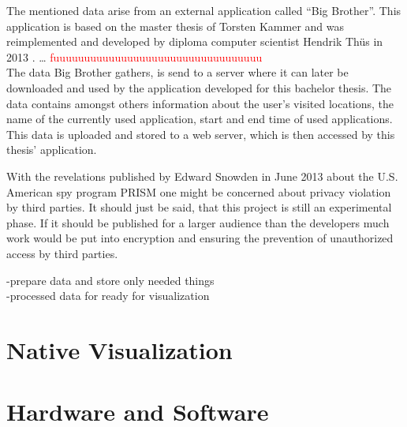 The  mentioned data arise from an external application called ``Big Brother''. This application is based on the master thesis of Torsten Kammer and was reimplemented and developed by diploma computer scientist Hendrik Th\"us in 2013 \cite{bigbrother}. \ldots{} %
\textcolor{red}{fuuuuuuuuuuuuuuuuuuuuuuuuuuuuuuuuuu}\\
The data Big Brother gathers, is send to a server where it can later be downloaded and used by the application developed for this bachelor thesis. The data contains amongst others information about the user's visited locations, the name of the currently used application, start and end time of used applications. This data is uploaded and stored to a web server, which is then accessed by this thesis' application.

With  the revelations published by Edward Snowden in June 2013 about the U.S. American spy program PRISM one might be concerned about privacy violation by third parties. It should just be said, that this project is still an experimental phase. If it should be published for a larger audience than the developers much work would be put into encryption and ensuring the prevention of unauthorized access by third parties.

-prepare data and store only needed things\\
-processed data for ready for visualization\\


\newpage
\section{Native Visualization}

\newpage
\section{Hardware and Software}